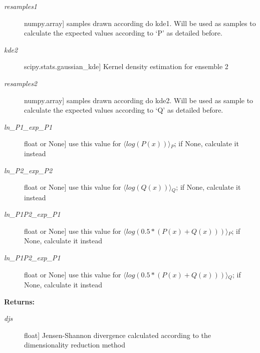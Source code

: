 \documentclass[letterpaper,10pt,english]{sphinxmanual}
\begin{document}
\begin{fulllineitems}
\begin{description}
\item[{\emph{resamples1}}] \leavevmode{[}numpy.array{]}
samples drawn according do kde1. Will be used as samples to calculate the expected values according to `P' as detailed before.

\item[{\emph{kde2}}] \leavevmode{[}scipy.stats.gaussian\_kde{]}
Kernel density estimation for ensemble 2

\item[{\emph{resamples2}}] \leavevmode{[}numpy.array{]}
samples drawn according do kde2. Will be used as sample to calculate the expected values according to `Q' as detailed before.

\item[{\emph{ln\_P1\_exp\_P1}}] \leavevmode{[}float or None{]}
use this value for \(\langle{}log(P(x))\rangle{}_P\); if None, calculate it instead

\item[{\emph{ln\_P2\_exp\_P2}}] \leavevmode{[}float or None{]}
use this value for \(\langle{}log(Q(x))\rangle{}_Q\); if None, calculate it instead

\item[{\emph{ln\_P1P2\_exp\_P1}}] \leavevmode{[}float or None{]}
use this value for \(\langle{}log(0.5*(P(x)+Q(x)))\rangle{}_P\);  if None, calculate it instead

\item[{\emph{ln\_P1P2\_exp\_P1}}] \leavevmode{[}float or None{]}
use this value for \(\langle{}log(0.5*(P(x)+Q(x)))\rangle{}_Q\); if None, calculate it instead

\end{description}

\textbf{Returns:}
\begin{description}
\item[{\emph{djs}}] \leavevmode{[}float{]}
Jensen-Shannon divergence calculated according to the dimensionality reduction method

\end{description}

\end{fulllineitems}

\end{document}
